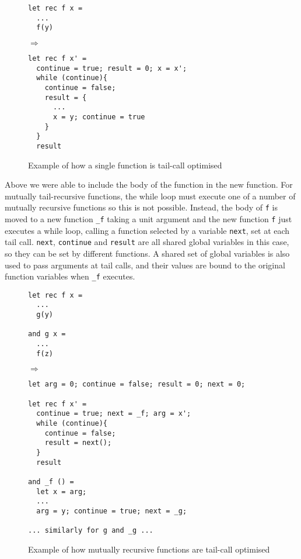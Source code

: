 \begin{figure}[H]
\begin{minipage}{0.24\textwidth}
\begin{verbatim}
let rec f x = 
  ...
  f(y)
\end{verbatim}
\end{minipage}
 $\Longrightarrow$ \hfill
\begin{minipage}{0.6\textwidth}  %
\begin{verbatim}
let rec f x' = 
  continue = true; result = 0; x = x';
  while (continue){
    continue = false;
    result = {
      ...
      x = y; continue = true
    }
  }
  result
\end{verbatim}
\end{minipage}
\caption{Example of how a single function is tail-call optimised}
\end{figure}


Above we were able to include the body of the function in the new function. For mutually tail-recursive functions, the while loop must execute one of a number of mutually recursive functions so this is not possible. Instead, the body of \verb|f| is moved to a new function \verb|_f| taking a unit argument and the new function \verb|f| just executes a while loop, calling a function selected by a variable \verb|next|, set at each tail call. \verb|next|, \verb|continue| and \verb|result| are all shared global variables in this case, so they can be set by different functions. A shared set of global variables is also used to pass arguments at tail calls, and their values are bound to the original function variables when \verb|_f| executes.

\begin{figure}[H]
\begin{minipage}{0.24\textwidth}
\begin{verbatim}
let rec f x = 
  ...
  g(y)

and g x = 
  ...
  f(z)
\end{verbatim}
\end{minipage}
 $\Longrightarrow$ \hfill
\begin{minipage}{0.65\textwidth}
\begin{verbatim}
let arg = 0; continue = false; result = 0; next = 0;

let rec f x' = 
  continue = true; next = _f; arg = x';
  while (continue){
    continue = false;
    result = next();
  }
  result

and _f () = 
  let x = arg;
  ...
  arg = y; continue = true; next = _g;

... similarly for g and _g ...
\end{verbatim}
\end{minipage}
\caption{Example of how mutually recursive functions are tail-call optimised}
\end{figure}




